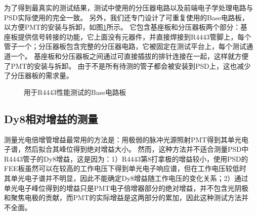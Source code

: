 为了得到最真实的测试结果，测试中使用的分压器电路以及前端电子学处理电路与PSD实际使用的完全一致。
另外，我们还专门设计了可重复使用的Base电路板，以方便PMT的安装与拆卸，如图\ref{fig:pmt_test:baseboard}所示。
它包含基座板和分压器板两个部分：基座板提供信号转接的功能，它上面没有元器件，并直接焊接到R4443管脚上，每个管子一个；分压器板包含完整的分压器电路，它被固定在测试平台上，每个测试通道一个。
基座板和分压器板之间通过可直接插拔的排针连接在一起，这样就方便了PMT的安装与拆卸。
由于不是所有待测的管子都会被安装到PSD上，这也减少了分压器板的需求量。
\begin{figure}[htbp]
	\centering
	\caption{用于R4443性能测试的Base电路板}
	\label{fig:pmt_test:baseboard}
\end{figure}

\subsection{Dy8相对增益的测量}
\label{sec:pmt_test:relative_gain}
测量光电倍增管增益最常用的方法是：用极弱的脉冲光源照射PMT得到其单光电子谱，然后拟合其峰位得到绝对增益大小。
然而，这种方法并不适合测量PSD中R4443管子的Dy8增益，这是因为：1）R4443第8打拿极的增益较小，使用PSD的FEE板虽然可以在较高的工作电压下得到单光电子响应谱，但在工作电压较低时其单光电子谱并不明显，因此不能确定Dy8增益随工作电压的变化关系；2）通过单光电子峰位得到的增益只是PMT电子倍增器部分的绝对增益，并不包含光阴极和聚焦电极的贡献，而PMT的实际增益是这两部分的累加，因此这种测试方法并不全面。

